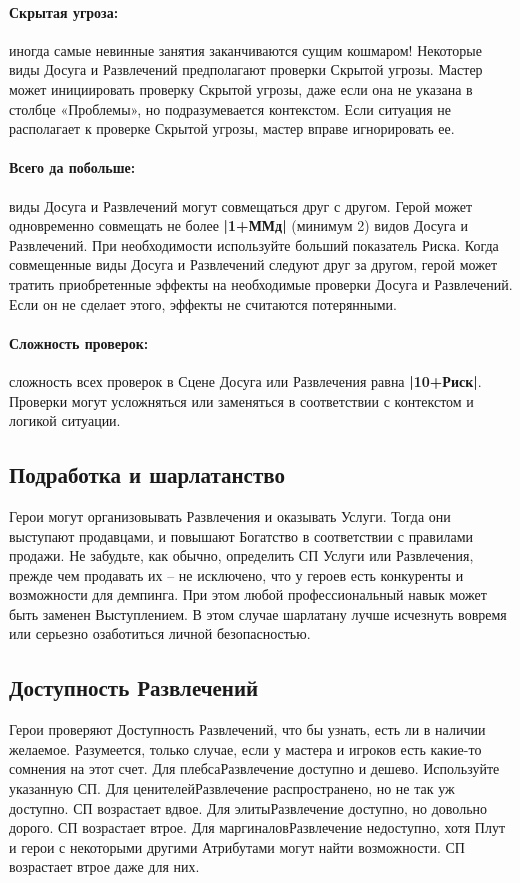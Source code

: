 \paragraph{Скрытая угроза:} иногда самые невинные занятия заканчиваются сущим кошмаром! Некоторые виды Досуга и Развлечений предполагают проверки Скрытой угрозы. Мастер может инициировать проверку Скрытой угрозы, даже если она не указана в столбце «Проблемы», но подразумевается контекстом. Если ситуация не располагает к проверке Скрытой угрозы, мастер вправе игнорировать ее.
\paragraph{Всего да побольше:} виды Досуга и Развлечений могут совмещаться друг с другом. Герой может одновременно совмещать не более \textbf{|1+ММд|} (минимум 2) видов Досуга и Развлечений. При необходимости используйте больший показатель Риска.
\newline Когда совмещенные виды Досуга и Развлечений следуют друг за другом, герой может тратить приобретенные эффекты на необходимые проверки Досуга и Развлечений. Если он не сделает этого, эффекты не считаются потерянными.
\paragraph{Сложность проверок:} сложность всех проверок в Сцене Досуга или Развлечения равна \textbf{|10+Риск|}. Проверки могут усложняться или заменяться в соответствии с контекстом и логикой ситуации.

\subsection{Подработка и шарлатанство}
Герои могут организовывать Развлечения и оказывать Услуги. Тогда они выступают продавцами, и повышают Богатство в соответствии с правилами продажи. Не забудьте, как обычно, определить СП Услуги или Развлечения, прежде чем продавать их – не исключено, что у героев есть конкуренты и возможности для демпинга.
\newline При этом любой профессиональный навык может быть заменен Выступлением. В этом случае шарлатану лучше исчезнуть вовремя или серьезно озаботиться личной безопасностью.
\subsection{Доступность Развлечений}
Герои проверяют Доступность Развлечений, что бы узнать, есть ли в наличии желаемое. Разумеется, только случае, если у мастера и игроков есть какие-то сомнения на этот счет.
\trouble
{Для плебса}{Развлечение доступно и дешево. Используйте указанную СП.}
{Для ценителей}{Развлечение распространено, но не так уж доступно. СП возрастает вдвое.}
{Для элиты}{Развлечение доступно, но довольно дорого. СП возрастает втрое.}
{Для маргиналов}{Развлечение недоступно, хотя Плут и герои с некоторыми другими Атрибутами могут найти возможности. СП возрастает втрое даже для них.}

